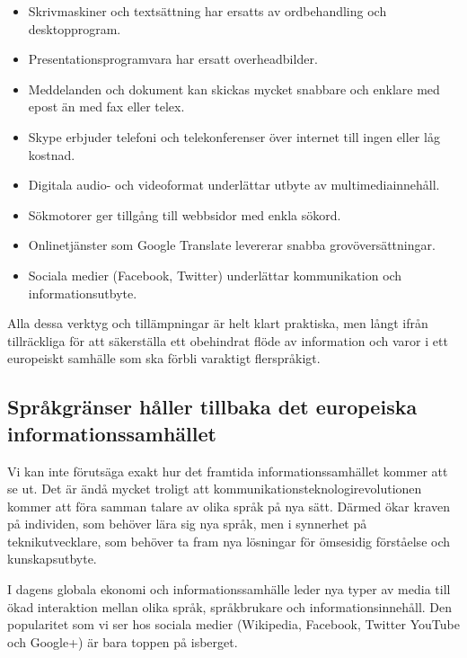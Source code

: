 \begin{multicols}{2}
\begin{itemize}
\item Skrivmaskiner och textsättning har ersatts av ordbehandling och
  desktopprogram.
\item Presentations\-programvara har ersatt over\-head\-bilder.
\item Meddelanden och dokument kan skickas mycket snabbare och enklare
  med epost än med fax eller telex.
\item Skype erbjuder telefoni och telekonferenser över internet till
  ingen eller låg kostnad.
\item Digitala audio- och videoformat underlättar utbyte av
  multi\-media\-innehåll.
\item Sökmotorer ger tillgång till webbsidor med enkla sökord.
\item Online\-tjänster som Google Translate levererar snabba
  grovöversättningar.
\item Sociala medier (Facebook, Twitter) underlättar kommunika\-tion
  och informations\-utbyte.
\end{itemize}

Alla dessa verktyg och tillämpningar är helt klart praktiska, men
långt ifrån tillräckliga för att säkerställa ett obehindrat flöde av
information och varor i ett europeiskt samhälle som ska förbli
varaktigt flerspråkigt.

\subsection{Språkgränser håller tillbaka det europe\-iska informa\-tions\-sam\-hället}
  
Vi kan inte förutsäga exakt hur det framtida in\-forma\-tions\-samhället
kommer att se ut. Det är ändå mycket troligt att
kom\-munika\-tions\-tekno\-logi\-revolu\-tion\-en kommer att föra
samman talare av olika språk på nya sätt. Därmed ökar kraven på
individen, som behöver lära sig nya språk, men i synnerhet på
teknik\-ut\-vecklare, som behöver ta fram nya lösningar för ömsesidig
förståelse och kunskapsutbyte.


I dagens globala ekonomi och informationssamhälle leder nya typer av
media till ökad interaktion mellan olika språk, språk\-brukare och
informationsinnehåll. Den popularitet som vi ser hos sociala medier
(Wikipedia, Facebook, Twitter YouTube och Google+) är bara toppen på
isberget.


\end{multicols}
